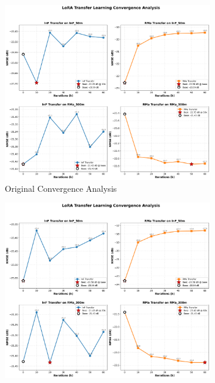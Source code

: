 \documentclass[conference]{IEEEtran}
\begin{document}
\begin{figure}[t]
\centering
\begin{subfigure}[b]{0.48\textwidth}
\centering
\includegraphics[width=\textwidth]{figures/iteration_convergence_analysis.png}
\caption{Original Convergence Analysis}
\label{fig:convergence_original}
\end{subfigure}
\hfill
\begin{subfigure}[b]{0.48\textwidth}
\centering
\includegraphics[width=\textwidth]{figures/iteration_convergence_analysis_new_models.png}

\end{subfigure}
\end{figure}
\end{document}
